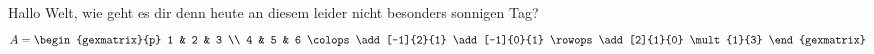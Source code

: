 \documentclass{article}
\begin{document}
Hallo Welt, wie geht es dir denn heute an diesem leider nicht besonders sonnigen Tag?
\begin{equation*}
    A = \begin{gexmatrix}{p}
        1 & 2 & 3 \\ 
        4 & 5 & 6
        \colops
        \add[-1]{2}{1}
        \add[-1]{0}{1}
        \rowops
        \add[2]{1}{0}
        \mult{1}{3}
    \end{gexmatrix}
\end{equation*}
\end{document}
